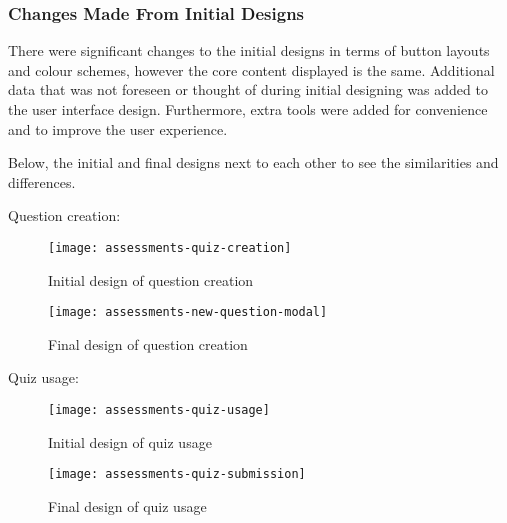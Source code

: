 \subsubsection{Changes Made From Initial Designs}
There were significant changes to the initial designs in terms of button layouts and colour schemes, however the core content displayed is the same. Additional data that was not foreseen or thought of during initial designing was added to the user interface design. Furthermore, extra tools were added for convenience and to improve the user experience. 

Below, the initial and final designs next to each other to see the similarities and differences.

Question creation:

\begin{figure}[h!]
	\centering
	\texttt{[image: assessments-quiz-creation]}
	\caption{Initial design of question creation}
\end{figure}

\begin{figure}[h!]
	\centering
	\texttt{[image: assessments-new-question-modal]}
	\caption{Final design of question creation}
\end{figure}


Quiz usage:

\begin{figure}[h!]
	\centering
	\texttt{[image: assessments-quiz-usage]}
	\caption{Initial design of quiz usage}
\end{figure}

\begin{figure}[h!]
	\centering
	\texttt{[image: assessments-quiz-submission]}
	\caption{Final design of quiz usage}
\end{figure}